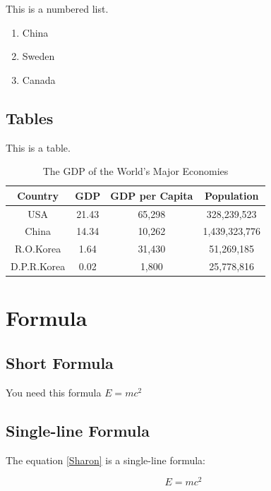 \documentclass{article}
\begin{document}
	This is a numbered list.

	\begin{enumerate}
		\item China
		\item Sweden
		\item Canada
	\end{enumerate}

	\subsection{Tables}

	\par This is a table.

	\begin{table}[htbp]
		\centering
		\caption{The GDP of the World's Major Economies}
		\begin{tabular}{cccc}
			\toprule
			Country & GDP & GDP per Capita & Population \\
			\midrule
			USA & 21.43 & 65,298 & 328,239,523 \\
			China & 14.34 & 10,262 & 1,439,323,776 \\
			R.O.Korea & 1.64 & 31,430 & 51,269,185 \\
			D.P.R.Korea & 0.02 & 1,800 & 25,778,816 \\
			\bottomrule
		\end{tabular}
	\end{table}

	\section{Formula}

	\subsection{Short Formula}

	\par You need this formula $E=mc^2$

	\subsection{Single-line Formula}
	
	\par The equation \eqref{Sharon} is a single-line formula:
	
	\begin{equation}\label{Sharon}
		E=mc^2
	\end{equation}
\end{document}
